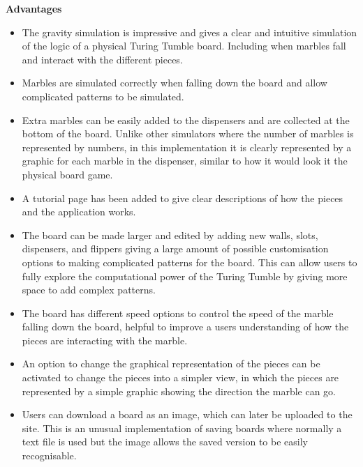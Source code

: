 \documentclass{l4proj}
\begin{document}
\textbf{Advantages}
\begin{itemize}
    \item The gravity simulation is impressive and gives a clear and intuitive simulation of the logic of a physical Turing Tumble board. Including when marbles fall and interact with the different pieces.
    \item Marbles are simulated correctly when falling down the board and allow complicated patterns to be simulated.
    \item Extra marbles can be easily added to the dispensers and are collected at the bottom of the board. Unlike other simulators where the number of marbles is represented by numbers, in this implementation it is clearly represented by a graphic for each marble in the dispenser, similar to how it would look it the physical board game.
    \item A tutorial page has been added to give clear descriptions of how the pieces and the application works.
    \item The board can be made larger and edited by adding new walls, slots, dispensers, and flippers giving a large amount of possible customisation options to making complicated patterns for the board. This can allow users to fully explore the computational power of the Turing Tumble by giving more space to add complex patterns.
    \item The board has different speed options to control the speed of the marble falling down the board, helpful to improve a users understanding of how the pieces are interacting with the marble.
    \item An option to change the graphical representation of the pieces can be activated to change the pieces into a simpler view, in which the pieces are represented by a simple graphic showing the direction the marble can go.
    \item Users can download a board as an image, which can later be uploaded to the site. This is an unusual implementation of saving boards where normally a text file is used but the image allows the saved version to be easily recognisable.
\end{itemize}
\end{document}
